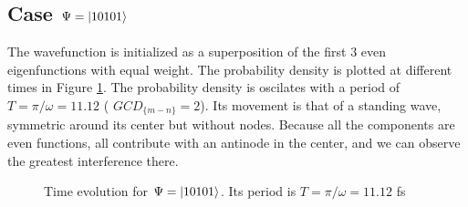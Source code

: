 \documentclass{cis320}
\begin{document}
\subsection{Case $\Psi = \ket{10101}$}

The wavefunction is initialized as a superposition of the first 3 even eigenfunctions with equal weight. The probability density is plotted at different times in Figure \ref{fig:H10101}. The probability density is oscilates with a period of $T=\pi/\omega=11.12$ ( $GCD_{\{m-n\}}=2$). Its movement is that of a standing wave, symmetric around its center but without nodes. Because all the components are even functions, all contribute with an antinode in the center, and we can observe the greatest interference there.
\begin{figure}[h!]
    \centering
    \caption{Time evolution for $\Psi = \ket{10101}$. Its period is $T=\pi/\omega=11.12$ fs}
    \label{fig:H10101}
\end{figure}
\end{document}
